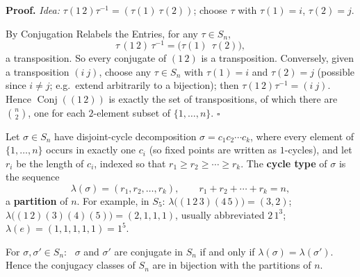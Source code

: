 \documentclass[11pt]{report}
\renewenvironment{proof}[1][Proof]{\noindent\textbf{#1.} }{\hfill$\square$\par\vspace{5pt}}
\begin{document}
\begin{proof}
\textit{Idea:} $\tau(1\,2)\tau^{-1} = (\tau(1)\ \tau(2))$; choose $\tau$ with $\tau(1) = i$, $\tau(2) = j$.\par
By Conjugation Relabels the Entries, for any $\tau \in S_n$,
\[ \tau\,(1\,2)\,\tau^{-1} = \big(\tau(1)\ \ \tau(2)\big), \]
a transposition. So every conjugate of $(1\,2)$ is a transposition. Conversely, given a transposition $(i\ j)$, choose any $\tau \in S_n$ with $\tau(1) = i$ and $\tau(2) = j$ (possible since $i \neq j$; e.g.\ extend arbitrarily to a bijection); then $\tau(1\,2)\tau^{-1} = (i\ j)$. Hence $\operatorname{Conj}((1\,2))$ is exactly the set of transpositions, of which there are $\binom{n}{2}$, one for each $2$-element subset of $\{1, \ldots, n\}$.
\end{proof}

\begin{defbox}\label{def:cycle-type}
Let $\sigma \in S_n$ have disjoint-cycle decomposition $\sigma = c_1 c_2 \cdots c_k$, where every element of $\{1, \ldots, n\}$ occurs in exactly one $c_i$ (so fixed points are written as $1$-cycles), and let $r_i$ be the length of $c_i$, indexed so that $r_1 \geq r_2 \geq \cdots \geq r_k$. The \textbf{cycle type} of $\sigma$ is the sequence
\[ \lambda(\sigma) = (r_1, r_2, \ldots, r_k), \qquad r_1 + r_2 + \cdots + r_k = n, \]
a \textbf{partition} of $n$. For example, in $S_5$: $\lambda\big((1\,2\,3)(4\,5)\big) = (3, 2)$; $\lambda\big((1\,2)(3)(4)(5)\big) = (2,1,1,1)$, usually abbreviated $2\,1^3$; $\lambda(e) = (1,1,1,1,1) = 1^5$.
\end{defbox}

\begin{thmbox}\label{thm:conjugacy-classes-sn-cycle-types}
For $\sigma, \sigma' \in S_n$: \ $\sigma$ and $\sigma'$ are conjugate in $S_n$ if and only if $\lambda(\sigma) = \lambda(\sigma')$. Hence the conjugacy classes of $S_n$ are in bijection with the partitions of $n$.
\end{thmbox}
\end{document}
